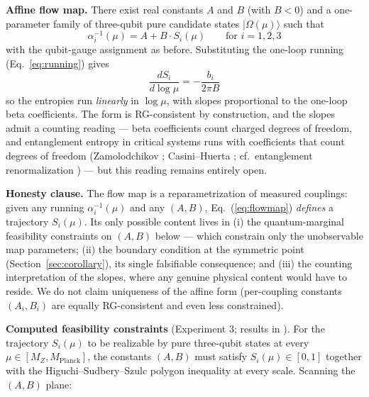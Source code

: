 \documentclass[11pt]{article}
\begin{document}
\textbf{Affine flow map.} There exist real constants $A$ and $B$ (with $B < 0$) and a one-parameter family of three-qubit pure candidate states $|\Omega(\mu)\rangle$ such that
\begin{equation}
\alpha_i^{-1}(\mu) = A + B \cdot S_i(\mu) \qquad \text{for } i = 1, 2, 3
\label{eq:flowmap}
\end{equation}
with the qubit-gauge assignment as before. Substituting the one-loop running (Eq.~\ref{eq:running}) gives
\begin{equation}
\frac{dS_i}{d\log\mu} = -\frac{b_i}{2\pi B}
\label{eq:flow}
\end{equation}
so the entropies run \emph{linearly} in $\log\mu$, with slopes proportional to the one-loop beta coefficients. The form is RG-consistent by construction, and the slopes admit a counting reading --- beta coefficients count charged degrees of freedom, and entanglement entropy in critical systems runs with coefficients that count degrees of freedom (Zamolodchikov \cite{zamolodchikov}; Casini--Huerta \cite{casini}; cf.\ entanglement renormalization \cite{vidal}) --- but this reading remains entirely open.

\textbf{Honesty clause.} The flow map is a reparametrization of measured couplings: given any running $\alpha_i^{-1}(\mu)$ and any $(A, B)$, Eq.~(\ref{eq:flowmap}) \emph{defines} a trajectory $S_i(\mu)$. Its only possible content lives in (i) the quantum-marginal feasibility constraints on $(A, B)$ below --- which constrain only the unobservable map parameters; (ii) the boundary condition at the symmetric point (Section~\ref{sec:corollary}), its single falsifiable consequence; and (iii) the counting interpretation of the slopes, where any genuine physical content would have to reside. We do not claim uniqueness of the affine form (per-coupling constants $(A_i, B_i)$ are equally RG-consistent and even less constrained).

\textbf{Computed feasibility constraints} (Experiment 3; results in ). For the trajectory $S_i(\mu)$ to be realizable by pure three-qubit states at every $\mu \in [M_Z, M_{\mathrm{Planck}}]$, the constants $(A, B)$ must satisfy $S_i(\mu) \in [0, 1]$ together with the Higuchi--Sudbery--Szulc polygon inequality \cite{higuchi} at every scale. Scanning the $(A, B)$ plane:
\end{document}
